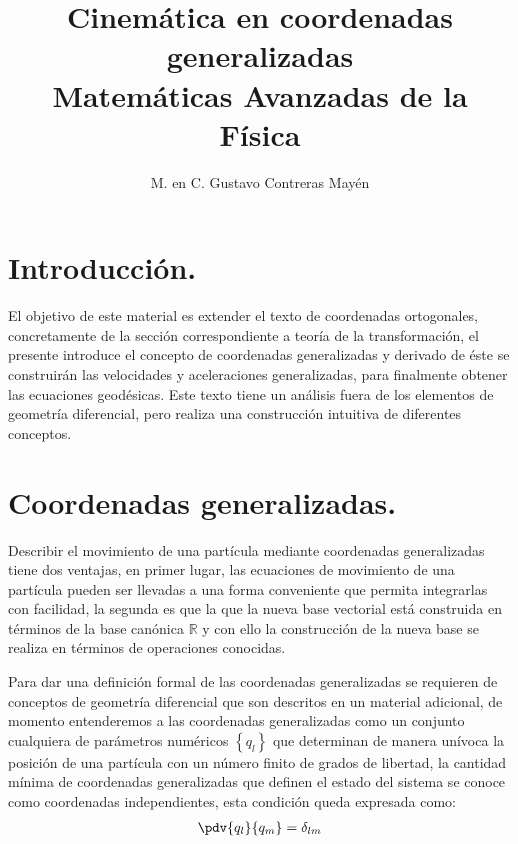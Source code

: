 
\usepackage{apacite}
\title{Cinemática en coordenadas generalizadas \\[0.3em]  \large{Matemáticas Avanzadas de la Física}\vspace{-3ex}}
\author{M. en C. Gustavo Contreras Mayén}
\date{ }

\vspace{-4cm}
\maketitle
\fontsize{14}{14}\selectfont
\tableofcontents
\newpage


\section{Introducción.}

El objetivo de este material es extender el texto de coordenadas ortogonales, concretamente de la sección correspondiente a teoría de la transformación, el presente introduce el concepto de coordenadas generalizadas y derivado de éste se construirán las velocidades y aceleraciones generalizadas, para finalmente obtener las ecuaciones geodésicas. Este texto tiene un análisis fuera de los elementos de geometría diferencial, pero realiza una construcción intuitiva de diferentes conceptos.

\section{Coordenadas generalizadas.}

Describir el movimiento de una partícula mediante coordenadas generalizadas tiene dos ventajas, en primer lugar, las ecuaciones de movimiento de una partícula pueden ser llevadas a una forma conveniente que permita integrarlas con facilidad, la segunda es que la que la nueva base vectorial está construida en términos de la base canónica $\mathbb{R}$ y con ello la construcción de la nueva base se realiza en términos de operaciones conocidas.
\par
Para dar una definición formal de las coordenadas generalizadas se requieren de conceptos de geometría diferencial que son descritos en un material adicional, de momento entenderemos a las coordenadas generalizadas como un conjunto cualquiera de parámetros numéricos $\left\{ q_{l} \right\}$ que determinan de manera unívoca la posición de una partícula con un número finito de grados de libertad, la cantidad mínima de coordenadas generalizadas que definen el estado del sistema se conoce como coordenadas independientes, esta condición queda expresada como:
\begin{align*}
\pdv{q_{l}}{q_{m}} = \delta_{l m}
\end{align*}

